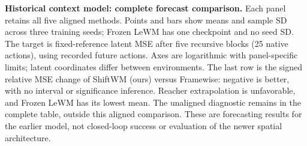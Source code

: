 \textbf{Historical context model: complete forecast comparison.}
Each panel retains all five aligned methods. Points and bars show means and
sample SD across three training seeds; Frozen LeWM has one checkpoint and no
seed SD. The target is fixed-reference latent MSE after five recursive blocks
(25 native actions), using recorded future actions. Axes are logarithmic with
panel-specific limits; latent coordinates differ between environments.
The last row is the signed relative MSE change of ShiftWM (ours) versus
Framewise: negative is better, with no interval or significance inference.
Reacher extrapolation is unfavorable, and Frozen LeWM has its lowest mean.
The unaligned diagnostic remains in the complete table, outside this aligned
comparison. These are forecasting results for the earlier model, not
closed-loop success or evaluation of the newer spatial architecture.
